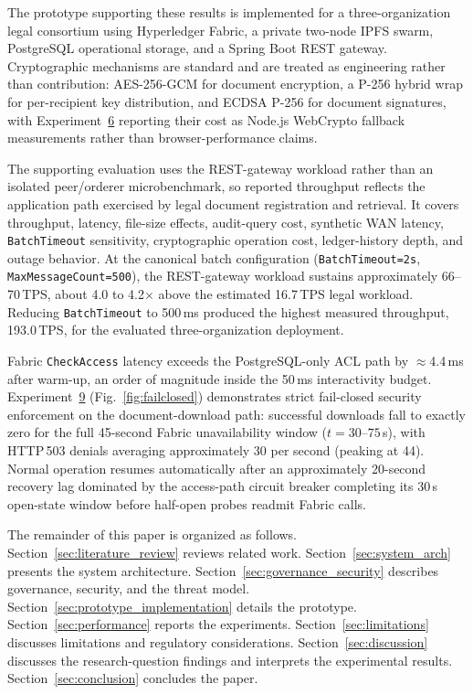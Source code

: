 \documentclass[preprint,12pt]{elsarticle}
\begin{document}
The prototype supporting these results is implemented for a
three-organization legal consortium using Hyperledger Fabric, a private
two-node IPFS swarm, PostgreSQL operational storage, and a Spring Boot REST
gateway. Cryptographic mechanisms are standard and are treated as
engineering rather than contribution: AES-256-GCM for document encryption,
a P-256 hybrid wrap for per-recipient key distribution, and
ECDSA P-256 for document signatures, with
Experiment~\hyperref[sec:exp_crypto]{6} reporting their cost as Node.js
WebCrypto fallback measurements rather than browser-performance claims.

The supporting evaluation uses the REST-gateway workload rather than an
isolated peer/orderer microbenchmark, so reported throughput reflects the
application path exercised by legal document registration and retrieval. It
covers
throughput, latency, file-size effects, audit-query cost, synthetic WAN
latency, \texttt{BatchTimeout} sensitivity, cryptographic operation cost,
ledger-history depth, and outage behavior. At the canonical batch
configuration (\texttt{BatchTimeout=2s},
\texttt{MaxMessageCount=500}), the REST-gateway
workload sustains approximately 66--70\,TPS, about 4.0 to 4.2$\times$ above the estimated
16.7\,TPS legal workload. Reducing \texttt{BatchTimeout} to 500\,ms produced
the highest measured throughput, 193.0\,TPS, for the evaluated
three-organization deployment.

Fabric \texttt{CheckAccess} latency exceeds the PostgreSQL-only ACL path by
$\approx$4.4\,ms after warm-up, an order of magnitude inside the 50\,ms
interactivity budget. Experiment~\hyperref[sec:exp_failclosed]{9}
(Fig.~\ref{fig:failclosed}) demonstrates strict fail-closed security
enforcement on the document-download path: successful downloads fall to
exactly zero for the full 45-second Fabric unavailability window
($t = 30$--$75$\,s), with HTTP\,503 denials averaging approximately
30 per second (peaking at 44).
Normal operation resumes automatically after an approximately 20-second
recovery lag dominated by the access-path circuit breaker completing its
30\,s open-state window before half-open probes readmit Fabric calls.

The remainder of this paper is organized as follows.
Section~\ref{sec:literature_review} reviews related work.
Section~\ref{sec:system_arch} presents the system architecture.
Section~\ref{sec:governance_security} describes governance, security,
and the threat model. Section~\ref{sec:prototype_implementation}
details the prototype. Section~\ref{sec:performance} reports the
experiments. Section~\ref{sec:limitations} discusses limitations and
regulatory considerations. Section~\ref{sec:discussion} discusses the
research-question findings and interprets the experimental results.
Section~\ref{sec:conclusion} concludes the paper.
\end{document}
